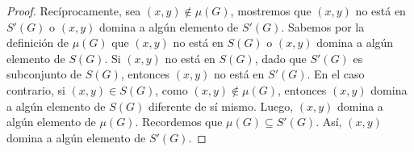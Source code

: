 \begin{proof}

Recíprocamente, sea $(x,y)\notin \mu(G)$, mostremos que $(x,y)$ no está en $S'(G)$ o $(x,y)$ domina a algún elemento de $S'(G)$. Sabemos por la definición de $\mu(G)$ que $(x,y)$ no está en $S(G)$ o $(x,y)$ domina a algún elemento de $S(G)$. Si $(x,y)$ no está en $S(G)$, dado que $S'(G)$ es subconjunto de $S(G)$, entonces $(x,y)$ no está en $S'(G)$. En el caso contrario, si $(x,y)\in S(G)$, como $(x,y)\notin \mu(G)$, entonces $(x,y)$ domina a algún elemento de $S(G)$ diferente de sí mismo. Luego, $(x,y)$ domina a algún elemento de $\mu(G)$. Recordemos que $\mu(G)\subseteq S'(G)$. Así, $(x,y)$ domina a algún elemento de $S'(G)$.

\end{proof}
